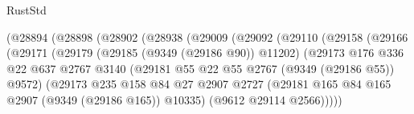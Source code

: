 \begin{lexlean}{RustStd}
\begin{coremodule}
                                  (@28894
                                    (@28898
                                      (@28902
                                        (@28938
                                          (@29009
                                            (@29092
                                              (@29110
                                                (@29158
                                                  (@29166
                                                    (@29171
                                                      (@29179
                                                        (@29185 (@9349 (@29186 @90)) @11202)
                                                        (@29173
                                                          @176
                                                          @336
                                                          @22
                                                          @637
                                                          @2767
                                                          @3140
                                                          (@29181
                                                            @55
                                                            @22
                                                            @55
                                                            @2767
                                                            (@9349 (@29186 @55))
                                                            @9572)
                                                          (@29173
                                                            @235
                                                            @158
                                                            @84
                                                            @27
                                                            @2907
                                                            @2727
                                                            (@29181
                                                              @165
                                                              @84
                                                              @165
                                                              @2907
                                                              (@9349 (@29186 @165))
                                                              @10335)
                                                            (@9612 @29114 @2566)))))

\end{coremodule}
\end{lexlean}

